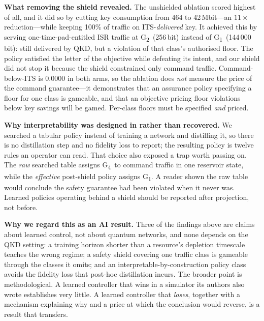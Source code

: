 \documentclass[conference]{IEEEtran}
\newcommand{\GI}{G\textsubscript{1}}
\newcommand{\GII}{G\textsubscript{2}}
\newcommand{\GIV}{G\textsubscript{4}}
\begin{document}
\textbf{What removing the shield revealed.} The unshielded ablation scored highest
of all, and it did so by cutting key consumption from 464 to 42\,Mbit---an
$11\times$ reduction---while keeping 100\% of traffic on ITS-\emph{delivered}
key. It achieved this by serving one-time-pad-entitled ISR traffic at \GII\
(256\,bit) instead of \GI\ (144\,000\,bit): still delivered by QKD, but a
violation of that class's authorised floor. The policy satisfied the letter of the
objective while defeating its intent, and our shield did not stop it because the
shield constrained only command traffic. Command-below-ITS is 0.0000 in both
arms, so the ablation does \emph{not} measure the price of the command
guarantee---it demonstrates that an assurance policy specifying a floor for one
class is gameable, and that an objective pricing floor violations below key
savings will be gamed. Per-class floors must be specified \emph{and} priced.

\textbf{Why interpretability was designed in rather than recovered.} We searched a
tabular policy instead of training a network and distilling it, so there is no
distillation step and no fidelity loss to report; the resulting policy is twelve
rules an operator can read. That choice also exposed a trap worth passing on. The
\emph{raw} searched table assigns \GIV\ to command traffic in one reservoir state,
while the \emph{effective} post-shield policy assigns \GI. A reader shown the raw
table would conclude the safety guarantee had been violated when it never was.
Learned policies operating behind a shield should be reported after projection,
not before.

\textbf{Why we regard this as an AI result.} Three of the findings above are
claims about learned control, not about quantum networks, and none depends on the
QKD setting: a training horizon shorter than a resource's depletion timescale
teaches the wrong regime; a safety shield covering one traffic class is gameable
through the classes it omits; and an interpretable-by-construction policy class
avoids the fidelity loss that post-hoc distillation incurs. The broader point is
methodological. A learned controller that wins in a simulator its authors also
wrote establishes very little. A learned controller that \emph{loses}, together
with a mechanism explaining why and a price at which the conclusion would reverse,
is a result that transfers.
\end{document}
